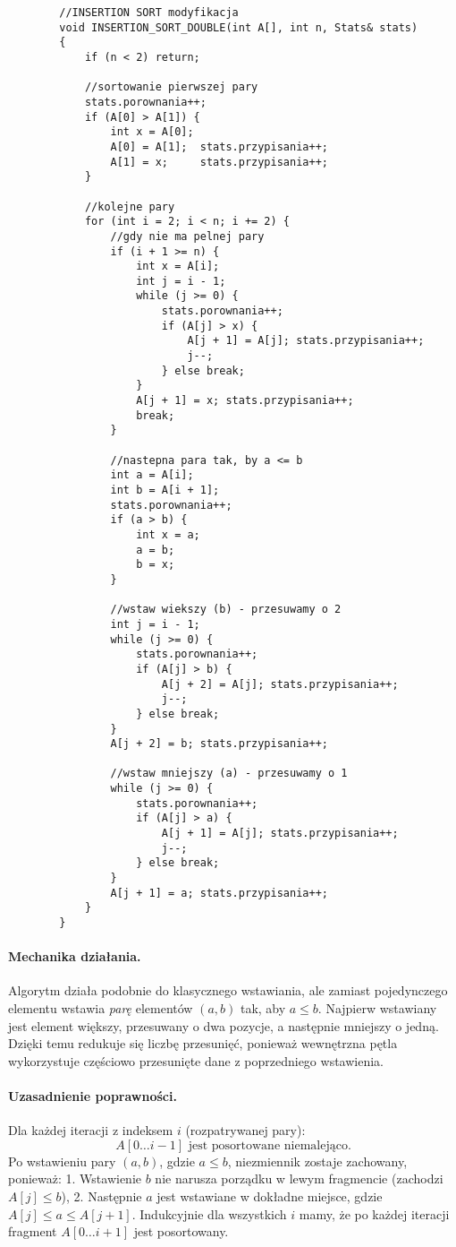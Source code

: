 \documentclass{article}
\begin{document}
	\begin{lstlisting}
		//INSERTION SORT modyfikacja
		void INSERTION_SORT_DOUBLE(int A[], int n, Stats& stats)
		{
			if (n < 2) return;
			
			//sortowanie pierwszej pary
			stats.porownania++;
			if (A[0] > A[1]) {
				int x = A[0];
				A[0] = A[1];  stats.przypisania++;
				A[1] = x;     stats.przypisania++;
			}
			
			//kolejne pary
			for (int i = 2; i < n; i += 2) {
				//gdy nie ma pelnej pary
				if (i + 1 >= n) {
					int x = A[i];
					int j = i - 1;
					while (j >= 0) {
						stats.porownania++;
						if (A[j] > x) {
							A[j + 1] = A[j]; stats.przypisania++;
							j--;
						} else break;
					}
					A[j + 1] = x; stats.przypisania++;
					break;
				}
				
				//nastepna para tak, by a <= b
				int a = A[i];     
				int b = A[i + 1];
				stats.porownania++;
				if (a > b) {
					int x = a; 
					a = b;
					b = x;
				}
				
				//wstaw wiekszy (b) - przesuwamy o 2
				int j = i - 1;
				while (j >= 0) {
					stats.porownania++;
					if (A[j] > b) {
						A[j + 2] = A[j]; stats.przypisania++;
						j--;
					} else break;
				}
				A[j + 2] = b; stats.przypisania++;
				
				//wstaw mniejszy (a) - przesuwamy o 1
				while (j >= 0) {
					stats.porownania++;
					if (A[j] > a) {
						A[j + 1] = A[j]; stats.przypisania++;
						j--;
					} else break;
				}
				A[j + 1] = a; stats.przypisania++;
			}
		}
	\end{lstlisting}
	
	\paragraph{Mechanika działania.}
	Algorytm działa podobnie do klasycznego wstawiania, ale zamiast pojedynczego elementu wstawia \emph{parę} elementów $(a,b)$ tak, aby $a \le b$. Najpierw wstawiany jest element większy, przesuwany o dwa pozycje, a następnie mniejszy o jedną.  
	Dzięki temu redukuje się liczbę przesunięć, ponieważ wewnętrzna pętla wykorzystuje częściowo przesunięte dane z poprzedniego wstawienia.
	
	\paragraph{Uzasadnienie poprawności.}
	Dla każdej iteracji z indeksem $i$ (rozpatrywanej pary):
	\[
	A[0 \dots i-1] \text{ jest posortowane niemalejąco.}
	\]
	Po wstawieniu pary $(a,b)$, gdzie $a\le b$, niezmiennik zostaje zachowany, ponieważ:
	1. Wstawienie $b$ nie narusza porządku w lewym fragmencie (zachodzi $A[j]\le b$),
	2. Następnie $a$ jest wstawiane w dokładne miejsce, gdzie $A[j]\le a \le A[j+1]$.
	Indukcyjnie dla wszystkich $i$ mamy, że po każdej iteracji fragment $A[0\dots i+1]$ jest posortowany.
	
\end{document}
